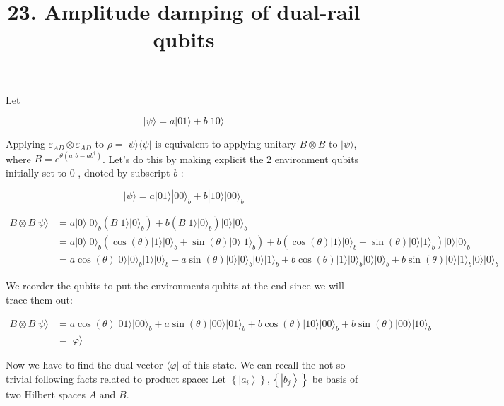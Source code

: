 \documentclass[10pt]{article}
\title{23. Amplitude damping of dual-rail qubits }
\author{}
\date{}
\begin{document}
\maketitle


Let

$$
  |\psi\rangle=a|01\rangle+b|10\rangle
$$

Applying $\varepsilon_{A D} \otimes \varepsilon_{A D}$ to $\rho=|\psi\rangle\langle\psi|$ is equivalent to applying unitary $B \otimes B$ to $|\psi\rangle$, where $B=e^{\theta\left(a^{\dagger} b-a b^{\dagger}\right)}$. Let's do this by making explicit the 2 environment qubits initially set to 0 , dnoted by subscript $b$ :

$$
  |\psi\rangle=a|01\rangle|00\rangle_{b}+b|10\rangle|00\rangle_{b}
$$

$$
  \begin{aligned}
    B \otimes B|\psi\rangle & =a|0\rangle|0\rangle_{b}\left(B|1\rangle|0\rangle_{b}\right)+b\left(B|1\rangle|0\rangle_{b}\right)|0\rangle|0\rangle_{b}                                                                                                                         \\
                            & =a|0\rangle|0\rangle_{b}\left(\cos (\theta)|1\rangle|0\rangle_{b}+\sin (\theta)|0\rangle|1\rangle_{b}\right)+b\left(\cos (\theta)|1\rangle|0\rangle_{b}+\sin (\theta)|0\rangle|1\rangle_{b}\right)|0\rangle|0\rangle_{b}                         \\
                            & =a \cos (\theta)|0\rangle|0\rangle_{b}|1\rangle|0\rangle_{b}+a \sin (\theta)|0\rangle|0\rangle_{b}|0\rangle|1\rangle_{b}+b \cos (\theta)|1\rangle|0\rangle_{b}|0\rangle|0\rangle_{b}+b \sin (\theta)|0\rangle|1\rangle_{b}|0\rangle|0\rangle_{b}
  \end{aligned}
$$

We reorder the qubits to put the environments qubits at the end since we will trace them out:


\begin{align*}
  B \otimes B|\psi\rangle & =a \cos (\theta)|01\rangle|00\rangle_{b}+a \sin (\theta)|00\rangle|01\rangle_{b}+b \cos (\theta)|10\rangle|00\rangle_{b}+b \sin (\theta)|00\rangle|10\rangle_{b}  \tag{4} \\
                          & =|\varphi\rangle
\end{align*}


Now we have to find the dual vector $\langle\varphi|$ of this state. We can recall the not so trivial following facts related to product space: Let $\left\{\left|a_{i}\right\rangle\right\},\left\{\left|b_{j}\right\rangle\right\}$ be basis of two Hilbert spaces $A$ and $B$.
\end{document}
